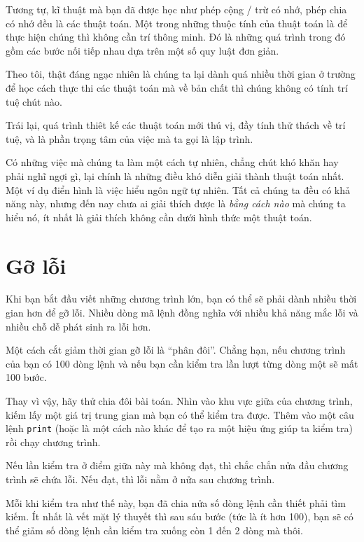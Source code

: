 \documentclass[11pt]{book}
\begin{document}

Tương tự, kĩ thuật mà bạn đã được học như phép cộng / trừ có
nhớ, phép chia có nhớ đều là các thuật toán. Một trong những
thuộc tính của thuật toán là để thực hiện chúng thì không cần trí
thông minh. Đó là những quá trình trong đó gồm các bước nối tiếp
nhau dựa trên một số quy luật đơn giản.

Theo tôi, thật đáng ngạc nhiên là chúng ta lại dành quá nhiều thời 
gian ở trường để học cách thực thi các thuật toán mà về bản chất thì
chúng không có tính trí tuệ chút nào.

Trái lại, quá trình thiêt kế các thuật toán mới thú vị, đầy tính thử
thách về trí tuệ, và là phần trọng tâm của việc mà ta gọi là lập trình.

Có những việc mà chúng ta làm một cách tự nhiên, chẳng chút khó
khăn hay phải nghĩ ngợi gì, lại chính là những điều khó diễn giải thành
thuật toán nhất. Một ví dụ điển hình là việc hiểu ngôn ngữ tự nhiên.
Tất cả chúng ta đều có khả năng này, nhưng đến nay chưa ai giải thích
được là {\em bằng cách nào} mà chúng ta hiểu nó, ít nhất là giải thích
không cần dưới hình thức một thuật toán.


\section{Gỡ lỗi}

Khi bạn bắt đầu viết những chương trình lớn, bạn có thể sẽ phải dành
nhiều thời gian hơn để gỡ lỗi. Nhiều dòng mã lệnh đồng nghĩa với 
nhiều khả năng mắc lỗi và nhiều chỗ dễ phát sinh ra lỗi hơn.


Một cách cắt giảm thời gian gỡ lỗi là ``phân đôi''.
Chẳng hạn, nếu chương trình của bạn có 100 dòng lệnh và
nếu bạn cần kiểm tra lần lượt từng dòng một sẽ mất 100 bước.

Thay vì vậy, hãy thử chia đôi bài toán. Nhìn vào khu vực giữa của
chương trình, kiếm lấy một giá trị trung gian mà bạn có thể
kiểm tra được. Thêm vào một câu lệnh {\tt print} (hoặc là một
cách nào khác để tạo ra một hiệu ứng giúp ta kiểm tra) rồi chạy
chương trình.

Nếu lần kiểm tra ở điểm giữa này mà không đạt, thì chắc chắn 
nửa đầu chương trình sẽ chứa lỗi. Nếu đạt, thì lỗi nằm ở nửa sau
chương trình.

Mỗi khi kiểm tra như thế này, bạn đã chia nửa số dòng lệnh cần
thiết phải tìm kiếm. Ít nhất là vết mặt lý thuyết thì sau sáu bước 
(tức là ít hơn 100), bạn sẽ có thể giảm số dòng lệnh cần kiểm tra
xuống còn 1 đến 2 dòng mà thôi.
\end{document}
